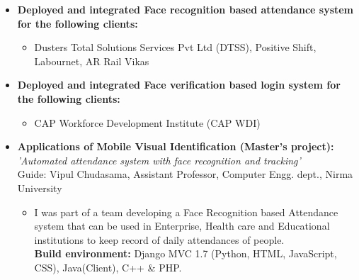 \documentclass[11pt,letterpaper,sans]{moderncv}        %
\begin{document}
\begin{itemize}

\item{\textbf{Deployed and integrated Face recognition based attendance system for the following clients:}
\vspace{1pt}

\small{
\begin{itemize}
\item Dusters Total Solutions Services Pvt Ltd (DTSS), Positive Shift, Labournet, AR Rail Vikas
\end{itemize}}}

\vspace{5pt}

\item{\textbf{Deployed and integrated Face verification based login system for the following clients:}
\vspace{1pt}

\small{
\begin{itemize}
\item CAP Workforce Development Institute (CAP WDI)
\end{itemize}}}

\vspace{5pt}

\item{\textbf{Applications of Mobile Visual Identification (Master's project):}
\\ \textit{'Automated attendance system with face recognition and tracking'}
\\ Guide: Vipul Chudasama, Assistant Professor, Computer Engg. dept., Nirma University
\vspace{1pt}

\small{
\begin{itemize}
\item I was part of a team developing a Face Recognition based Attendance system that can be used in Enterprise, Health care and Educational institutions to keep record of daily attendances of people.
\\ \textbf{ Build environment:} Django MVC 1.7 (Python, HTML, JavaScript, CSS), Java(Client), C++ \& PHP.
\end{itemize}}}

\vspace{5pt}


\end{itemize}
\end{document}
